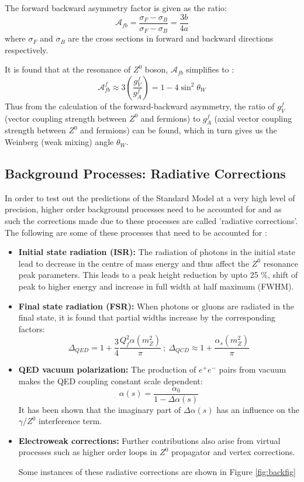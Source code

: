 The forward backward asymmetry factor is given as the ratio:
\begin{equation}
\mathcal{A}_{fb}=\dfrac{\sigma_{F}-\sigma_{B}}{\sigma_{F}-\sigma_{B}}=\dfrac{3b}{4a}
\end{equation}
where $\sigma_{F}$ and $\sigma_{B}$ are the cross sections in forward and backward directions respectively.

It is found that at the resonance of $Z^{0}$ boson, $\mathcal{A}_{fb}$ simplifies to \cite{UB}:
\begin{equation}
\mathcal{A}_{fb}^{f}\approx 3\left(\dfrac{g_{V}^{f}}{g_{A}^{f}}\right)=1-4\sin^{2}\theta_{W} 
\end{equation}
Thus from the calculation of the forward-backward asymmetry, the ratio of $g_{V}^{f}$ (vector coupling strength between $Z^{0}$ and fermions) to $g_{A}^{f}$ (axial vector coupling strength between $Z^{0}$ and fermions) can be found, which in turn gives us the Weinberg (weak mixing) angle $\theta_{W}$.
\subsection{Background Processes: Radiative Corrections}
In order to test out the predictions of the Standard Model at a very high level of precision, higher order background processes need to be accounted for and as such the corrections made due to these processes are called 'radiative corrections'. The following are some of these processes that need to be accounted for \cite{Zedometry}:
\begin{itemize}
\item \textbf{Initial state radiation (ISR):} The radiation of photons in the initial state lead to decrease in the centre of mass energy and thus affect the $Z^{0}$ resonance peak parameters. This leads to a peak height reduction by upto 25 \%, shift of peak to higher energy and increase in full width at half maximum (FWHM). 
\item \textbf{Final state radiation (FSR):} When photons or gluons are radiated in the final state, it is found that partial widths increase by the corresponding factors:
\begin{equation}
\Delta_{QED}=1+\dfrac{3}{4}\dfrac{Q_{f}^{2}\alpha(m_{Z}^{2})}{\pi}\ ;\ \Delta_{QCD}\approx 1+\dfrac{\alpha_{s}(m_{Z}^{2})}{\pi}
\end{equation}
\item \textbf{QED vacuum polarization:} The production of $e^{+}e^{-}$ pairs from vacuum makes the QED coupling constant scale dependent: 
\begin{equation}
\alpha(s)=\dfrac{\alpha_{0}}{1-\Delta \alpha(s)}
\end{equation}
It has been shown that the imaginary part of $\Delta \alpha(s)$ has an influence on the $\gamma / Z^{0}$ interference term.
\item \textbf{Electroweak corrections:} Further contributions also arise from virtual processes such as higher order loops in $Z^{0}$ propagator and vertex corrections.


Some instances of these radiative corrections are shown in Figure \ref{fig:backfig}
\end{itemize}

